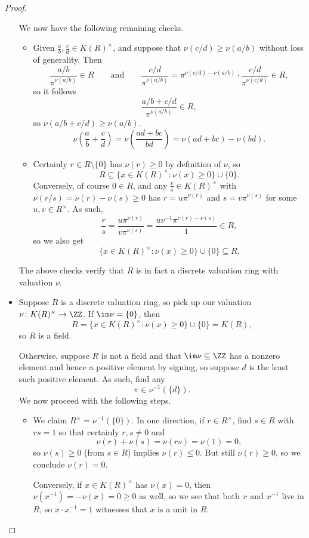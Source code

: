 \begin{proof}
\begin{itemize}
		We now have the following remaining checks.
		\begin{itemize}
			\item Given $\frac ab,\frac cd\in K(R)^\times$, and suppose that $\nu(c/d)\ge\nu(a/b)$ without loss of generality. Then
			\[\frac{a/b}{\pi^{\nu(a/b)}}\in R\qquad\text{and}\qquad\frac{c/d}{\pi^{\nu(a/b)}}=\pi^{\nu(c/d)-\nu(a/b)}\cdot\frac{c/d}{\pi^{\nu(c/d)}}\in R,\]
			so it follows
			\[\frac{a/b+c/d}{\pi^{\nu(a/b)}}\in R,\]
			so $\nu(a/b+c/d)\ge\nu(a/b)$.
			\[\nu\left(\frac ab+\frac cd\right)=\nu\left(\frac{ad+bc}{bd}\right)=\nu(ad+bc)-\nu(bd).\]
			\item Certainly $r\in R\setminus\{0\}$ has $\nu(r)\ge0$ by definition of $\nu$, so
			\[R\subseteq\{x\in K(R)^\times:\nu(x)\ge0\}\cup\{0\}.\]
			Conversely, of course $0\in R$, and any $\frac rs\in K(R)^\times$ with $\nu(r/s)=\nu(r)-\nu(s)\ge0$ has $r=u\pi^{\nu(r)}$ and $s=v\pi^{\nu(s)}$ for some $u,v\in R^\times$. As such,
			\[\frac rs=\frac{u\pi^{\nu(r)}}{v\pi^{\nu(s)}}=\frac{uv^{-1}\pi^{\nu(r)-\nu(s)}}1\in R,\]
			so we also get
			\[\{x\in K(R)^\times:\nu(x)\ge0\}\cup\{0\}\subseteq R.\]
		\end{itemize}
		The above checks verify that $R$ is in fact a discrete valuation ring with valuation $\nu$.

		\item Suppose $R$ is a discrete valuation ring, so pick up our valuation $\nu\colon K(R)^\times\to\ZZ$. If $\im\nu=\{0\}$, then
		\[R=\{x\in K(R)^\times:\nu(x)\ge0\}\cup\{0\}=K(R),\]
		so $R$ is a field.

		Otherwise, suppose $R$ is not a field and that $\im\nu\subseteq\ZZ$ has a nonzero element and hence a positive element by signing, so suppose $d$ is the least such positive element. As such, find any
		\[\pi\in\nu^{-1}(\{d\}).\]
		We now proceed with the following steps.
		\begin{itemize}
			\item We claim $R^\times=\nu^{-1}(\{0\})$. In one direction, if $r\in R^\times$, find $s\in R$ with $rs=1$ so that certainly $r,s\ne0$ and
			\[\nu(r)+\nu(s)=\nu(rs)=\nu(1)=0,\]
			so $\nu(s)\ge0$ (from $s\in R$) implies $\nu(r)\le0$. But still $\nu(r)\ge0$, so we conclude $\nu(r)=0$.

			Conversely, if $x\in K(R)^\times$ has $\nu(x)=0$, then $\nu\left(x^{-1}\right)=-\nu(x)=0\ge0$ as well, so we see that both $x$ and $x^{-1}$ live in $R$, so $x\cdot x^{-1}=1$ witnesses that $x$ is a unit in $R$.
			

\end{itemize}
\end{itemize}
\end{proof}
